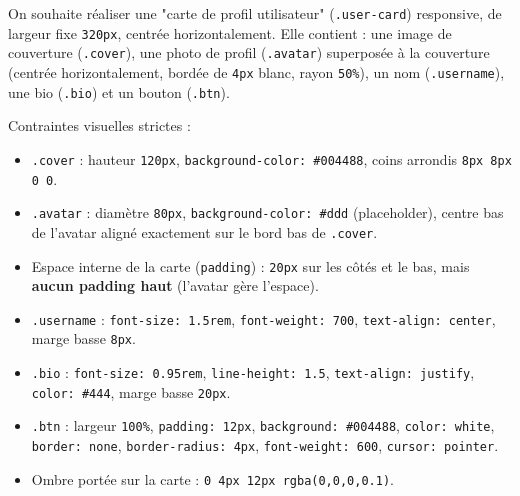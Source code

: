 \documentclass[11pt]{article}
\begin{document}
\begin{exercice}
On souhaite réaliser une "carte de profil utilisateur" (\texttt{.user-card}) responsive, de largeur fixe \texttt{320px}, centrée horizontalement. Elle contient : une image de couverture (\texttt{.cover}), une photo de profil (\texttt{.avatar}) superposée à la couverture (centrée horizontalement, bordée de \texttt{4px} blanc, rayon \texttt{50\%}), un nom (\texttt{.username}), une bio (\texttt{.bio}) et un bouton (\texttt{.btn}).

Contraintes visuelles strictes :
\begin{itemize}
    \item \texttt{.cover} : hauteur \texttt{120px}, \texttt{background-color: \#004488}, coins arrondis \texttt{8px 8px 0 0}.
    \item \texttt{.avatar} : diamètre \texttt{80px}, \texttt{background-color: \#ddd} (placeholder), centre bas de l'avatar aligné exactement sur le bord bas de \texttt{.cover}.
    \item Espace interne de la carte (\texttt{padding}) : \texttt{20px} sur les côtés et le bas, mais \textbf{aucun padding haut} (l'avatar gère l'espace).
    \item \texttt{.username} : \texttt{font-size: 1.5rem}, \texttt{font-weight: 700}, \texttt{text-align: center}, marge basse \texttt{8px}.
    \item \texttt{.bio} : \texttt{font-size: 0.95rem}, \texttt{line-height: 1.5}, \texttt{text-align: justify}, \texttt{color: \#444}, marge basse \texttt{20px}.
    \item \texttt{.btn} : largeur \texttt{100\%}, \texttt{padding: 12px}, \texttt{background: \#004488}, \texttt{color: white}, \texttt{border: none}, \texttt{border-radius: 4px}, \texttt{font-weight: 600}, \texttt{cursor: pointer}.
    \item Ombre portée sur la carte : \texttt{0 4px 12px rgba(0,0,0,0.1)}.
\end{itemize}


\end{exercice}
\end{document}
